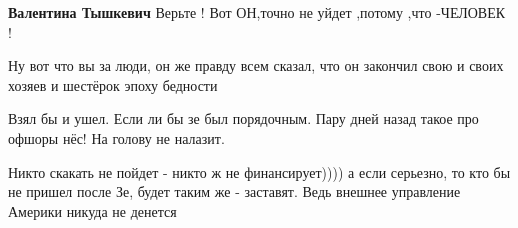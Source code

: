 \begin{itemize}
\begin{itemize}
\textbf{Валентина Тышкевич} Верьте ! Вот ОН,точно не уйдет ,потому ,что -ЧЕЛОВЕК !
\end{itemize} %

Ну вот что вы за люди, он же правду всем сказал, что он закончил свою и своих хозяев и шестёрок эпоху бедности

Взял бы и ушел. Если ли бы зе был порядочным. Пару дней назад такое про офшоры нёс! На голову не налазит.


Никто скакать не пойдет - никто ж не финансирует)))) а если серьезно, то кто бы
не пришел после Зе, будет таким же - заставят. Ведь внешнее управление Америки
никуда не денется


\end{itemize} %

